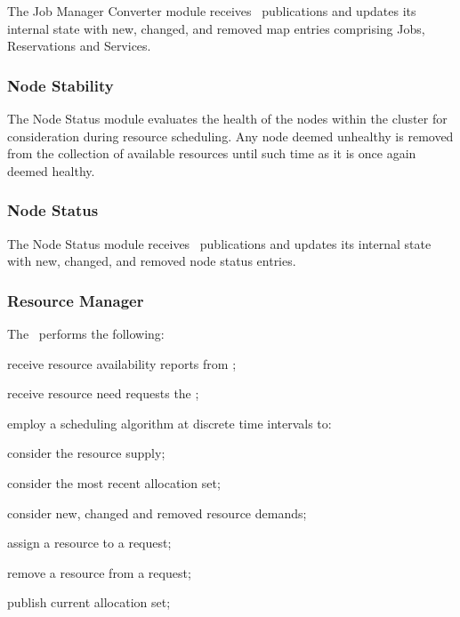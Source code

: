 \begin{itemize}
    The Job Manager Converter module receives \varOrchestrator~publications and
    updates its internal state with new, changed, and removed map entries
    comprising Jobs, Reservations and Services.
        
    \subsubsection{Node Stability}
    
    The Node Status module evaluates the health of the nodes within the cluster
    for consideration during resource scheduling.  Any node deemed unhealthy is
    removed from the collection of available resources until such time as it
    is once again deemed healthy.
      
    \subsubsection{Node Status} 
        
    The Node Status module receives \varAgent~publications and
    updates its internal state with new, changed, and removed node status entries.
     
    \subsubsection{Resource Manager} 
    
    The \varResourceManager~performs the following:
    
    \begin{description}
      \item receive resource availability reports from \varAgents;
      \item receive resource need requests the \varOrchestrator;
      \item employ a scheduling algorithm at discrete time intervals to:
      \begin{description}
        \item consider the resource supply;
        \item consider the most recent allocation set;
        \item consider new, changed and removed resource demands;
        \item assign a resource to a request;
        \item remove a resource from a request;
        \item publish current allocation set;
      \end{description} 
    \end{description}     
        

\end{itemize}
